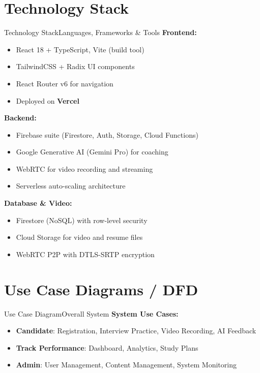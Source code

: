 \documentclass{beamer}
\begin{document}
\section{Technology Stack}
\begin{frame}{Technology Stack}{Languages, Frameworks \& Tools}
\textbf{Frontend:}
\begin{itemize}
    \item React 18 + TypeScript, Vite (build tool)
    \item TailwindCSS + Radix UI components
    \item React Router v6 for navigation
    \item Deployed on \textbf{Vercel}
\end{itemize}

\vspace{3pt}

\textbf{Backend:}
\begin{itemize}
    \item Firebase suite (Firestore, Auth, Storage, Cloud Functions)
    \item Google Generative AI (Gemini Pro) for coaching
    \item WebRTC for video recording and streaming
    \item Serverless auto-scaling architecture
\end{itemize}

\vspace{3pt}

\textbf{Database \& Video:}
\begin{itemize}
    \item Firestore (NoSQL) with row-level security
    \item Cloud Storage for video and resume files
    \item WebRTC P2P with DTLS-SRTP encryption
\end{itemize}
\end{frame}

\section{Use Case Diagrams / DFD}
\begin{frame}{Use Case Diagram}{Overall System}
\textbf{System Use Cases:}
\begin{itemize}
    \item \textbf{Candidate}: Registration, Interview Practice, Video Recording, AI Feedback
    \item \textbf{Track Performance}: Dashboard, Analytics, Study Plans
    \item \textbf{Admin}: User Management, Content Management, System Monitoring
\end{itemize}
\end{frame}
\end{document}

